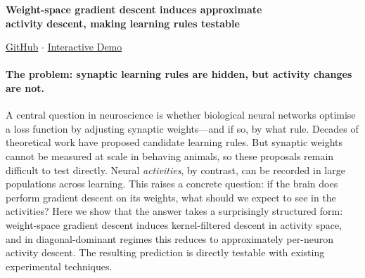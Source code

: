 \documentclass[10pt]{article}
\begin{document}
\begin{center}
  {\Large\bfseries Weight-space gradient descent induces approximate\\ activity descent, making learning rules testable}
\end{center}
\vspace{-2pt}
\begin{center}
  \small
  \href{https://github.com/koerding/ADescent}{GitHub} $\cdot$
  \href{https://koerding.github.io/ADescent/}{Interactive Demo}
\end{center}
\vspace{-2pt}

\small

\paragraph{The problem: synaptic learning rules are hidden, but activity changes are not.}
A central question in neuroscience is whether biological neural networks optimise a loss function by adjusting synaptic weights---and if so, by what rule.  Decades of theoretical work have proposed candidate learning rules.  But synaptic weights cannot be measured at scale in behaving animals, so these proposals remain difficult to test directly.  Neural \emph{activities}, by contrast, can be recorded in large populations across learning.  This raises a concrete question: if the brain does perform gradient descent on its weights, what should we expect to see in the activities?  Here we show that the answer takes a surprisingly structured form: weight-space gradient descent induces kernel-filtered descent in activity space, and in diagonal-dominant regimes this reduces to approximately per-neuron activity descent.  The resulting prediction is directly testable with existing experimental techniques.
\end{document}
